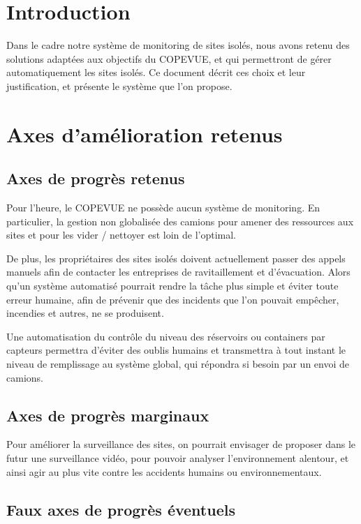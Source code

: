 \section{Introduction}

Dans le cadre notre système de monitoring de sites isolés, nous avons retenu des solutions adaptées aux objectifs du COPEVUE, et qui permettront de gérer automatiquement les sites isolés. Ce document décrit ces choix et leur justification, et présente le système que l’on propose.

\section{Axes d’amélioration retenus}

\subsection{Axes de progrès retenus}

Pour l’heure, le COPEVUE ne possède aucun système de monitoring. En particulier, la gestion non globalisée des camions pour amener des ressources aux sites et pour les vider /  nettoyer est loin de l’optimal.

De plus, les propriétaires des sites isolés doivent actuellement passer des appels manuels afin de contacter les entreprises de ravitaillement et d’évacuation. Alors qu’un système automatisé pourrait rendre la tâche plus simple et éviter toute erreur humaine, afin de prévenir que des incidents que l’on pouvait empêcher, incendies et autres, ne se produisent.

Une automatisation du contrôle du niveau des réservoirs ou containers par capteurs permettra d’éviter des oublis humains et transmettra à tout instant le niveau de remplissage au système global, qui répondra si besoin par un envoi de camions.

\subsection{Axes de progrès marginaux}

Pour améliorer la surveillance des sites, on pourrait envisager de proposer dans le futur une surveillance vidéo, pour pouvoir analyser l’environnement alentour, et ainsi agir au plus vite contre les accidents humains ou environnementaux.

\subsection{Faux axes de progrès éventuels}


